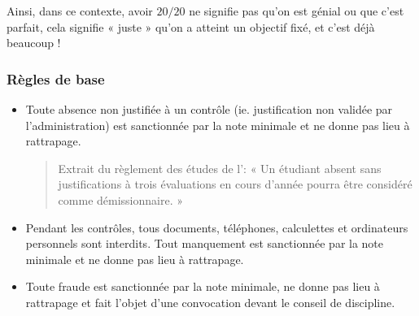 \documentclass[11pt,a4paper,colorlinks,breaklinks]{article}
\begin{document}
Ainsi, dans ce contexte, avoir $20/20$ ne signifie pas qu'on est génial ou que c'est parfait,
cela signifie « juste » qu'on a atteint un objectif fixé, et c'est déjà beaucoup !

\subsubsection{Règles de base}
\begin{itemize}
\item Toute absence non justifiée à un contrôle (ie. justification non validée par l'administration) est sanctionnée 
par la note minimale et ne donne pas lieu à rattrapage.

\begin{quote}
Extrait du règlement des études de l'\enib : « Un étudiant absent sans justifications 
à trois évaluations en cours d'année pourra être considéré comme démissionnaire. »
\end{quote}

\item Pendant les contrôles, tous documents, téléphones, calculettes et ordinateurs personnels sont interdits. Tout manquement est sanctionnée par la note minimale et ne donne pas lieu à rattrapage.

\item Toute fraude est sanctionnée par la note minimale, ne donne pas lieu à rattrapage et
fait l'objet d'une convocation devant le conseil de discipline.
\end{itemize}

\end{document}
